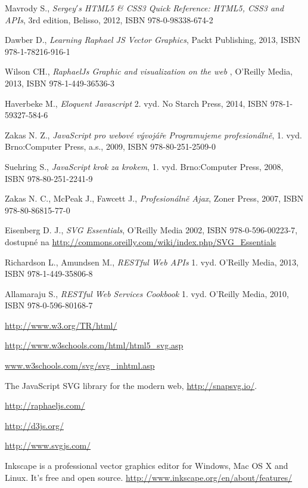 \begin{thebibliography}{99}                               
	 \label{literatura}


 Mavrody S.,
 {\it Sergey$'$s HTML5 \& CSS3 Quick Reference: HTML5, CSS3 and APIs},
 3rd edition, Belisso, 2012, ISBN  978-0-98338-674-2



Dawber D.,
{\it Learning Raphael JS Vector Graphics}, 
 Packt Publishing, 2013, ISBN 978-1-78216-916-1
         
 
 
 Wilson CH., {\it RaphaelJs Graphic and visualization on the web} , 
O'Reilly Media, 2013, ISBN 978-1-449-36536-3
         

Haverbeke M., 
{\it Eloquent Javascript} 2. vyd. No Starch Press, 2014, ISBN 978-1-59327-584-6


Zakas N. Z., 
{\it JavaScript pro webové vývojáře Programujeme profesionálně},
 1. vyd. Brno:Computer Press, a.s., 2009,  ISBN 978-80-251-2509-0

Suehring S., 
{\it JavaScript krok za krokem},
1. vyd. Brno:Computer Press, 2008, ISBN 978-80-251-2241-9

Zakas N. C., McPeak J., Fawcett J.,
{\it Profesionálně Ajax},
Zoner Press, 2007,  ISBN 978-80-86815-77-0

Eisenberg D. J., {\it SVG Essentials}, 
O'Reilly Media 2002, ISBN  978-0-596-00223-7,  dostupné na \url{http://commons.oreilly.com/wiki/index.php/SVG_Essentials}

Richardson L., Amundsen M., {\it RESTful Web APIs} 
1. vyd. O'Reilly Media, 2013, 
ISBN 978-1-449-35806-8

Allamaraju S., {\it RESTful Web Services Cookbook} 
1. vyd. O'Reilly Media, 2010, 
ISBN 978-0-596-80168-7





\url{http://www.w3.org/TR/html/}

\url{ http://www.w3schools.com/html/html5_svg.asp}

\url{www.w3schools.com/svg/svg_inhtml.asp}


The JavaScript SVG library for the modern web,
\url{http://snapsvg.io/}.


\url{ http://raphaeljs.com/}

\url {http://d3js.org/}

 
 \url{http://www.svgjs.com/}


Inkscape is a professional vector graphics editor for Windows, Mac OS X and Linux. It's free and open source.
\url {http://www.inkscape.org/en/about/features/}

\end{thebibliography}